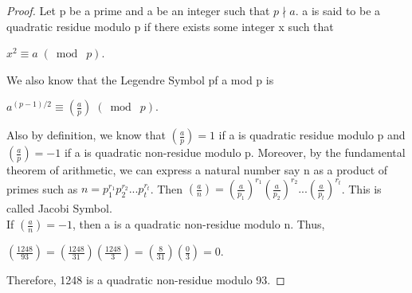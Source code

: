\documentclass{article}
\begin{document}
\begin{proof}
Let p be a prime and a be an integer such that $p \nmid a$. a is said to be a quadratic residue modulo p if there exists some integer x such that
\begin{center}
    $x^2 \equiv a \;(\bmod\; p)$.
\end{center}
We also know that the Legendre Symbol pf a mod p is
\begin{center}
    $a^{(p-1)/2} \equiv (\frac{a}{p}) \;(\bmod\; p)$.
\end{center}
Also by definition, we know that $(\frac{a}{p}) = 1$ if a is quadratic residue modulo p and $(\frac{a}{p}) = -1$ if a is quadratic non-residue modulo p. Moreover, by the fundamental theorem of arithmetic, we can express a natural number say n as a product of primes such as $n = p_1^{r_1}p_2^{r_2}...p_t^{r_t}$. Then $(\frac{a}{n}) = (\frac{a}{p_1})^{r_1}(\frac{a}{p_2})^{r_2}...(\frac{a}{p_t})^{r_t}$. This is called Jacobi Symbol.\\
If $(\frac{a}{n}) = -1$, then a is a quadratic non-residue modulo n. Thus,
\begin{center}
    $(\frac{1248}{93}) = (\frac{1248}{31}) (\frac{1248}{3}) = (\frac{8}{31})(\frac{0}{3}) = 0$.
\end{center}
Therefore, 1248 is a quadratic non-residue modulo 93.
\end{proof} 
\end{document}
